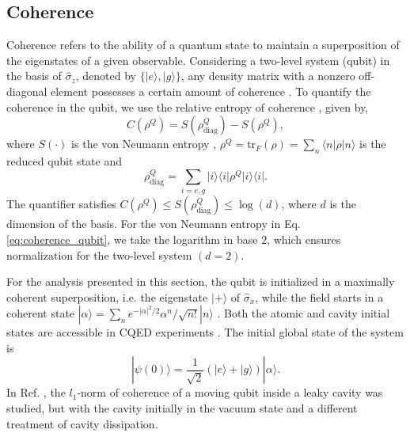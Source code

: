 \documentclass[aps,pre,superscriptaddress,twocolumn,10pt]{revtex4-2}
\begin{document}
\subsection{Coherence}
\label{subsec: coherence}
Coherence refers to the ability of a quantum state to maintain a superposition of the eigenstates of a given observable. 
Considering a two-level system (qubit) in the basis of $\hat{\sigma}_z$, denoted by $\{|e\rangle,|g\rangle\}$, any density matrix with a nonzero off-diagonal element possesses a certain amount of coherence \cite{Messinger2019,Streltsov2017}.
To quantify the coherence in the qubit, we use the relative entropy of coherence \cite{Baumgratz2014}, given by,
\begin{equation}
    C(\rho^{Q}) = S(\rho^{Q}_{\text{diag}}) - S(\rho^{Q}),
    \label{eq:coherence_qubit}
\end{equation}
where $S(\cdot)$ is the von Neumann entropy \cite{VonNeumann1927b,Nielsen2010}, $\rho^{Q}=\text{tr}_F(\rho)=\sum_n \langle n|\rho|n\rangle$ is the reduced qubit state and 
\begin{equation}
    \rho^{Q}_{\text{diag}}=\sum_{i=e,g}|i\rangle \langle i|\rho^{Q}|i\rangle \langle i|.
\end{equation} 
The quantifier satisfies $C(\rho^{Q}) \leq S(\rho^{Q}_{\text{diag}}) \leq \log(d)$,
where $d$ is the dimension of the basis.
For the von Neumann entropy in Eq. \eqref{eq:coherence_qubit}, we take the logarithm in base $2$, which ensures normalization for the two-level system $(d=2)$.

For the analysis presented in this section, the qubit is initialized in a maximally coherent superposition, i.e. the eigenstate $|+\rangle$ of $\hat{\sigma}_x$,
while the field starts in a coherent state $|\alpha\rangle = \sum_{n} e^{-|\alpha|^2/2} \alpha^n/\sqrt{n!} |n\rangle$ \cite{Glauber1963c,GERRY2005}.
Both the atomic and cavity initial states are accessible in CQED experiments \cite{Brune1996,Marrocco2005,Haroche2013}. 
The initial global state of the system is
\begin{equation} \label{eq:superposition}
|\psi(0)\rangle = \frac{1}{\sqrt{2}} \left( |e\rangle + |g\rangle \right) |\alpha\rangle.
\end{equation}
In Ref. \cite{Mortezapour2017b}, the $l_1$-norm of coherence of a moving qubit inside a leaky cavity was studied, but with the cavity initially in the vacuum state and a different treatment of cavity dissipation.
\end{document}
